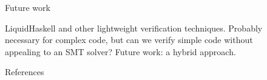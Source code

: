 \documentclass[final,dvipsnames]{beamer}
\newlength{\sepwidth}
\newlength{\colwidth}
\newcommand{\separatorcolumn}{\begin{column}{\sepwidth}\end{column}}
\newcommand\todo[1]{{\color{Red}#1}}
\begin{document}
\begin{frame}[t]
\begin{columns}[t]
\begin{column}{\colwidth}
  \begin{block}{Future work}

    \todo{LiquidHaskell and other lightweight verification techniques. Probably
      necessary for complex code, but can we verify simple code without
      appealing to an SMT solver? Future work: a hybrid approach.}
  \end{block}

  \begin{block}{References}
    \footnotesize{}
  \end{block}

\end{column}

\separatorcolumn













\end{columns}
\end{frame}
\end{document}
